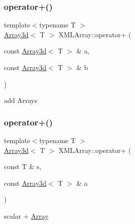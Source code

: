 \mbox{\label{namespaceXMLArray_a63ffde7a3ab533938f603805d5b517e8}} 
\subsubsection{\texorpdfstring{operator+()}{operator+()}\hspace{0.1cm}{\footnotesize\ttfamily [1/6]}}
{\footnotesize\ttfamily template$<$typename T $>$ \\
\mbox{\hyperlink{classXMLArray_1_1Array3d}{Array3d}}$<$ T $>$ X\+M\+L\+Array\+::operator+ (\begin{DoxyParamCaption}\item[{const \mbox{\hyperlink{classXMLArray_1_1Array3d}{Array3d}}$<$ T $>$ \&}]{a,  }\item[{const \mbox{\hyperlink{classXMLArray_1_1Array3d}{Array3d}}$<$ T $>$ \&}]{b }\end{DoxyParamCaption})\hspace{0.3cm}{\ttfamily [inline]}}



add Arrays 

\mbox{\label{namespaceXMLArray_a38e9584aa25b1b93bbdeda1cc0d680c6}} 
\subsubsection{\texorpdfstring{operator+()}{operator+()}\hspace{0.1cm}{\footnotesize\ttfamily [2/6]}}
{\footnotesize\ttfamily template$<$typename T $>$ \\
\mbox{\hyperlink{classXMLArray_1_1Array3d}{Array3d}}$<$ T $>$ X\+M\+L\+Array\+::operator+ (\begin{DoxyParamCaption}\item[{const T \&}]{s,  }\item[{const \mbox{\hyperlink{classXMLArray_1_1Array3d}{Array3d}}$<$ T $>$ \&}]{a }\end{DoxyParamCaption})\hspace{0.3cm}{\ttfamily [inline]}}



scalar + \mbox{\hyperlink{classXMLArray_1_1Array}{Array}} 

\mbox{\label{namespaceXMLArray_ab4d92c674c66f7fcce8e97c5c9a2a665}} 
